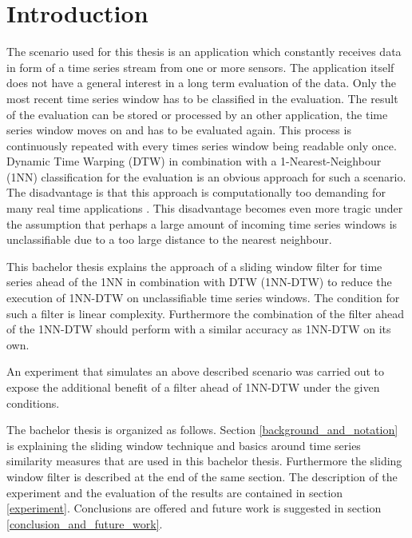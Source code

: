 \section{Introduction} \label{introduction}
The scenario used for this thesis is an application which constantly receives data in form of a time series stream from
one or more sensors. The application itself does not have a general interest in a long term evaluation of the data. Only
the most recent time series window has to be classified in the evaluation. The result of the evaluation can be stored or
processed by an other application, the time series window moves on and has to be evaluated again. This process is
continuously repeated with every times series window being readable only once. Dynamic Time Warping (DTW) in combination
with a 1-Nearest-Neighbour (1NN) classification for the evaluation is an obvious approach for such a scenario. The
disadvantage is that this approach is computationally too demanding for many real time applications \cite{xi2006fast}.
This disadvantage becomes even more tragic under the assumption that perhaps a large amount of incoming time series
windows is unclassifiable due to a too large distance to the nearest neighbour.

This bachelor thesis explains the approach of a sliding window filter for time series ahead of the 1NN in combination
with DTW (1NN-DTW) to reduce the execution of 1NN-DTW on unclassifiable time series windows. The condition for such a
filter is linear complexity. Furthermore the combination of the filter ahead of the 1NN-DTW should perform with a
similar accuracy as 1NN-DTW on its own.

An experiment that simulates an above described scenario was carried out to expose the additional benefit of a filter
ahead of 1NN-DTW under the given conditions.%

The bachelor thesis is organized as follows. Section \ref{background_and_notation} is explaining the sliding window
technique and basics around time series similarity measures that are used in this bachelor thesis. Furthermore
the sliding window filter is described at the end of the same section. The description of the experiment and the
evaluation of the results are contained in section \ref{experiment}. Conclusions are offered and future work
is suggested in section \ref{conclusion_and_future_work}.
